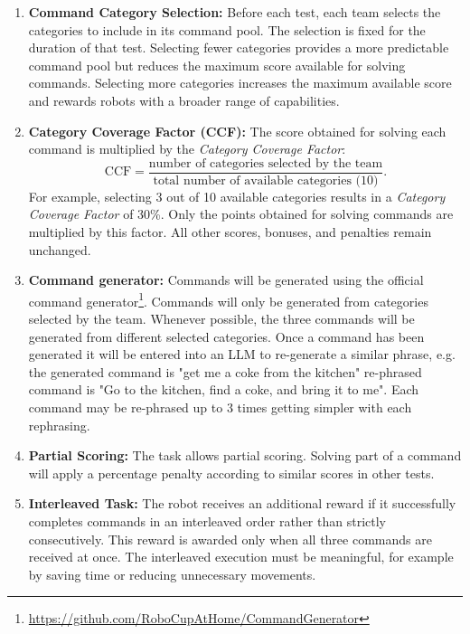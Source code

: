 \begin{enumerate}[nosep]
\begin{enumerate}[nosep,label=\arabic*)]
		\item \textbf{Pour into Tableware:} The robot retrieves a specified drink or food and pours it into the requested item of tableware. \textit{Example:} Pour the orange juice into the cup on the dining table.
		\item \textbf{Move a Chair:} The robot moves a specified chair to a requested location. \textit{Example:} Move one of the dining table chairs next to the sofa.
	\end{enumerate}
	\item \textbf{Command Category Selection:} Before each test, each team selects the categories to include in its command pool. The selection is fixed for the duration of that test. Selecting fewer categories provides a more predictable command pool but reduces the maximum score available for solving commands. Selecting more categories increases the maximum available score and rewards robots with a broader range of capabilities.
	\item \textbf{Category Coverage Factor (CCF):} The score obtained for solving each command is multiplied by the \textit{Category Coverage Factor}:
	\[
		\mathrm{CCF} = \frac{\text{number of categories selected by the team}}{\text{total number of available categories (10)}}.
	\]
	For example, selecting 3 out of 10 available categories results in a \textit{Category Coverage Factor} of 30\%. Only the points obtained for solving commands are multiplied by this factor. All other scores, bonuses, and penalties remain unchanged.
	\item \textbf{Command generator:} Commands will be generated using the official command generator\footnote{\url{https://github.com/RoboCupAtHome/CommandGenerator}}. Commands will only be generated from categories selected by the team. Whenever possible, the three commands will be generated from different selected categories. Once a command has been generated it will be entered into an LLM to re-generate a similar phrase, e.g. the generated command is "get me a coke from the kitchen" re-phrased command is "Go to the kitchen, find a coke, and bring it to me". Each command may be re-phrased up to 3 times getting simpler with each rephrasing.
	\item \textbf{Partial Scoring:} The task allows partial scoring. Solving part of a command will apply a percentage penalty according to similar scores in other tests.
	\item \textbf{Interleaved Task:} The robot receives an additional reward if it successfully completes commands in an interleaved order rather than strictly consecutively. This reward is awarded only when all three commands are received at once. The interleaved execution must be meaningful, for example by saving time or reducing unnecessary movements.

\end{enumerate}
